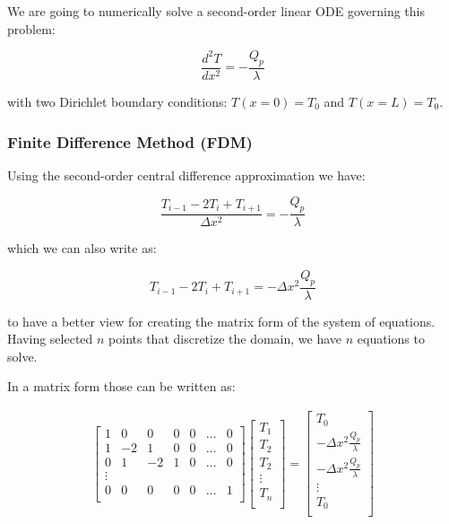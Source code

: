We are going to numerically solve a second-order linear ODE governing this problem:

$$\frac{d^2 T}{dx^2} = - \frac{Q_p}{\lambda}$$

with two Dirichlet boundary conditions: $T(x=0) = T_0$ and $T(x=L) = T_0$.

\subsubsection{Finite Difference Method (FDM)}

Using the second-order central difference approximation we have:

$$\frac{T_{i-1} - 2 T_i + T_{i+1}}{\Delta x^2} = - \frac{Q_p}{\lambda}$$

which we can also write as:

$$T_{i-1} - 2 T_i + T_{i+1} = - \Delta x^2 \frac{Q_p}{\lambda}$$

to have a better view for creating the matrix form of the system of equations. Having selected $n$ points that discretize the domain, we have $n$ equations to solve.

In a matrix form those can be written as:

\begin{gather}
\begin{bmatrix}
1 & 0 & 0 & 0 & 0 & \dots & 0 \\
1 & -2 & 1 & 0 & 0 & \dots & 0 \\
0 & 1 & -2 & 1 & 0 & \dots & 0 \\
\vdots \\
0 & 0 & 0 & 0 & 0 & \dots & 1 \\
\end{bmatrix}
\begin{bmatrix}
T_1  \\
T_2 \\
T_2 \\
\vdots \\
T_n \\
\end{bmatrix}
=
\begin{bmatrix}
T_0  \\
- \Delta x^2 \frac{Q_p}{\lambda} \\
- \Delta x^2 \frac{Q_p}{\lambda} \\
\vdots \\
T_0 \\
\end{bmatrix}
\end{gather}

